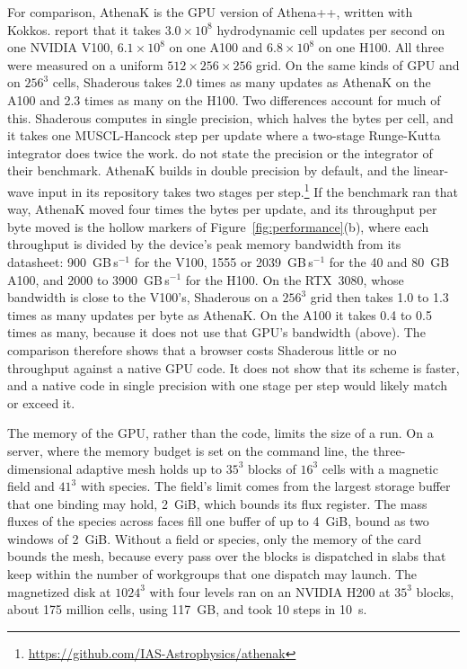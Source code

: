 \documentclass[twocolumn]{aastex701}
\begin{document}
For comparison, AthenaK is the GPU version of Athena++, written with Kokkos. \citet{Stone2026} report that it takes $3.0 \times 10^8$ hydrodynamic cell updates per second on one NVIDIA V100, $6.1 \times 10^8$ on one A100 and $6.8 \times 10^8$ on one H100. All three were measured on a uniform $512 \times 256 \times 256$ grid. On the same kinds of GPU and on $256^3$ cells, Shaderous takes 2.0 times as many updates as AthenaK on the A100 and 2.3 times as many on the H100. Two differences account for much of this. Shaderous computes in single precision, which halves the bytes per cell, and it takes one MUSCL-Hancock step per update where a two-stage Runge-Kutta integrator does twice the work. \citet{Stone2026} do not state the precision or the integrator of their benchmark. AthenaK builds in double precision by default, and the linear-wave input in its repository takes two stages per step.\footnote{\url{https://github.com/IAS-Astrophysics/athenak}} If the benchmark ran that way, AthenaK moved four times the bytes per update, and its throughput per byte moved is the hollow markers of Figure~\ref{fig:performance}(b), where each throughput is divided by the device's peak memory bandwidth from its datasheet: 900~GB\,s$^{-1}$ for the V100, 1555 or 2039~GB\,s$^{-1}$ for the 40 and 80~GB A100, and 2000 to 3900~GB\,s$^{-1}$ for the H100. On the RTX~3080, whose bandwidth is close to the V100's, Shaderous on a $256^3$ grid then takes 1.0 to 1.3 times as many updates per byte as AthenaK. On the A100 it takes 0.4 to 0.5 times as many, because it does not use that GPU's bandwidth (above). The comparison therefore shows that a browser costs Shaderous little or no throughput against a native GPU code. It does not show that its scheme is faster, and a native code in single precision with one stage per step would likely match or exceed it.

The memory of the GPU, rather than the code, limits the size of a run. On a server, where the memory budget is set on the command line, the three-dimensional adaptive mesh holds up to $35^3$ blocks of $16^3$ cells with a magnetic field and $41^3$ with species. The field's limit comes from the largest storage buffer that one binding may hold, 2~GiB, which bounds its flux register. The mass fluxes of the species across faces fill one buffer of up to 4~GiB, bound as two windows of 2~GiB. Without a field or species, only the memory of the card bounds the mesh, because every pass over the blocks is dispatched in slabs that keep within the number of workgroups that one dispatch may launch. The magnetized disk at $1024^3$ with four levels ran on an NVIDIA H200 at $35^3$ blocks, about 175 million cells, using 117~GB, and took 10 steps in 10~s.
\end{document}
